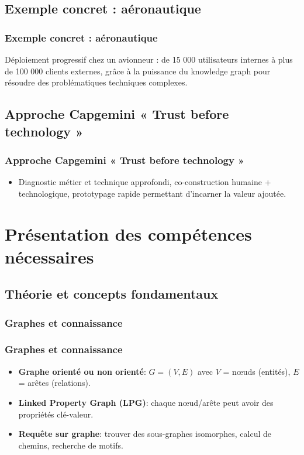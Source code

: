 \documentclass{beamer}
\begin{document}
\subsection{Exemple concret : aéronautique}
\begin{frame}
  \frametitle{Exemple concret : aéronautique}
  
  Déploiement progressif chez un avionneur : de 15 000 utilisateurs internes à plus de 100 000 clients externes, grâce à la puissance du knowledge graph pour résoudre des problématiques techniques complexes.
\end{frame}

\subsection{Approche Capgemini « Trust before technology »}
\begin{frame}
  \frametitle{Approche Capgemini « Trust before technology »}
  
  \begin{itemize}
    \item Diagnostic métier et technique approfondi, co-construction humaine + technologique, prototypage rapide permettant d’incarner la valeur ajoutée.
  \end{itemize}
\end{frame}

\section{Présentation des compétences nécessaires}

\subsection{Théorie et concepts fondamentaux}

\subsubsection{Graphes et connaissance}
\begin{frame}
  \frametitle{Graphes et connaissance}

  \begin{itemize}
    \item \textbf{Graphe orienté ou non orienté}: \( G = (V, E) \) avec \( V \) = nœuds (entités), \( E \) = arêtes (relations).
    \item \textbf{Linked Property Graph (LPG)}: chaque nœud/arête peut avoir des propriétés clé-valeur.
    \item \textbf{Requête sur graphe}: trouver des sous-graphes isomorphes, calcul de chemins, recherche de motifs.
  \end{itemize}
\end{frame}
\end{document}
